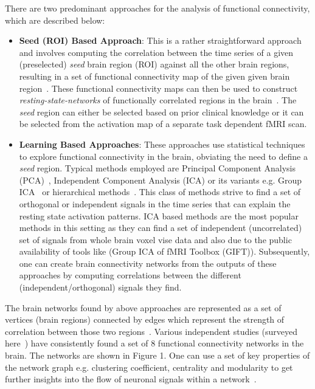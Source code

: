 \documentclass{llncs}
\begin{document}
There are two predominant approaches for the analysis of functional connectivity, which are described below:
\begin{itemize}
\item {\bf Seed (ROI) Based Approach}:  This is a rather straightforward approach and involves computing the correlation between the time series of a given (preselected) {\it seed} brain region (ROI) against all the other brain regions, resulting in a set of functional connectivity map of the given given brain region~\cite{biswal1997simultaneous,cordes2000mapping}. These functional connectivity maps can then be used to construct {\it resting-state-networks} of functionally correlated regions in the brain~\cite{damoiseaux2006consistent,fox2005human,beckmann2005investigations}. The {\it seed} region can either be selected based on prior clinical knowledge or it can be selected from the activation map of a separate task dependent fMRI scan.
\item {\bf Learning Based Approaches}: These approaches use statistical techniques to explore functional connectivity in the brain, obviating the need to define a {\it seed} region. Typical methods employed are Principal Component Analysis (PCA)~\cite{friston1998disconnection}, Independent Component Analysis (ICA) or its variants e.g. Group ICA~\cite{beckmann2005investigations,calhoun2001method,petrella2011default} or hierarchical methods~\cite{cordes2002hierarchical,salvador2005neurophysiological}. This class of methods strive to find a set of orthogonal or independent signals in the time series that can explain the resting state activation patterns. ICA based methods are the most popular methods in this setting as they can find a set of independent (uncorrelated) set of signals from whole brain voxel vise data and also due to the public availability of  tools like (Group ICA of fMRI Toolbox (GIFT)). Subsequently, one can create brain connectivity networks from the outputs of these approaches by computing correlations between the different (independent/orthogonal) signals they find.
 \end{itemize} 


The brain networks found by above approaches are represented as a set of vertices (brain regions) connected by edges which represent the strength of correlation between those two regions~\cite{he2010graph,stam2007graph}. Various independent studies (surveyed here~\cite{van2010exploring}) have consistently found a set of 8 functional connectivity networks in the brain. The networks are shown in Figure 1. One can use a set of key properties of the network graph e.g. clustering coefficient, centrality and modularity to get further insights into the flow of neuronal signals within a network~\cite{he2010graph,stam2007graph}.
\end{document}
